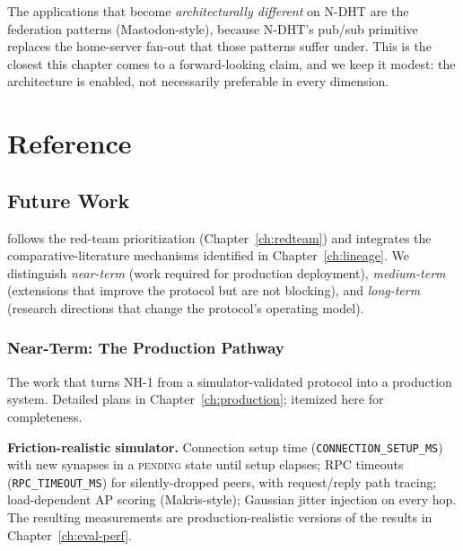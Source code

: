 \documentclass[twoside,nobib]{tufte-book}
\newcommand{\NDHT}{N-DHT\xspace}
\begin{document}
The applications that become \emph{architecturally different}
on \NDHT are the federation patterns (Mastodon-style),
because \NDHT's pub/sub primitive replaces the home-server
fan-out that those patterns suffer under. This is the closest
this chapter comes to a forward-looking claim, and we keep it
modest: the architecture is enabled, not necessarily preferable
in every dimension.


\part{Reference}


\chapter{Future Work}
\label{ch:future}

 follows the red-team
prioritization (Chapter~\ref{ch:redteam}) and integrates the
comparative-literature mechanisms identified in
Chapter~\ref{ch:lineage}. We distinguish \emph{near-term} (work
required for production deployment), \emph{medium-term}
(extensions that improve the protocol but are not blocking),
and \emph{long-term} (research directions that change the
protocol's operating model).

\section{Near-Term: The Production Pathway}

The work that turns NH-1 from a simulator-validated protocol
into a production system. Detailed plans in
Chapter~\ref{ch:production}; itemized here for completeness.

\textbf{Friction-realistic simulator.} Connection setup time
(\texttt{CONNECTION\_SETUP\_MS}) with new synapses in a
\textsc{pending} state until setup elapses; RPC timeouts
(\texttt{RPC\_TIMEOUT\_MS}) for silently-dropped peers, with
request/reply path tracing; load-dependent AP scoring
(Makris-style); Gaussian jitter injection on every hop. The
resulting measurements are production-realistic versions of the
results in Chapter~\ref{ch:eval-perf}.
\end{document}
